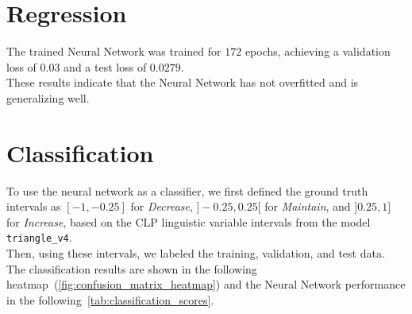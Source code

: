 \documentclass[titlepage]{article}
\begin{document}
\section{Regression}

The trained Neural Network was trained for $172$ epochs, achieving a validation loss of $0.03$ and a test loss of $0.0279$. \\
These results indicate that the Neural Network has not overfitted and is generalizing well.

\section{Classification}

To use the neural network as a classifier, we first defined the ground truth intervals as \([-1, -0.25]\) for \emph{Decrease}, \(]-0.25, 0.25[\) for \emph{Maintain}, and \(]0.25, 1]\) for \emph{Increase}, based on the CLP linguistic variable intervals from the model \texttt{triangle\_v4}.\\
Then, using these intervals, we labeled the training, validation, and test data.
The classification results are shown in the following heatmap~(\cref{fig:confusion_matrix_heatmap}) and the Neural Network performance in the following~\cref{tab:classification_scores}.

\end{document}
